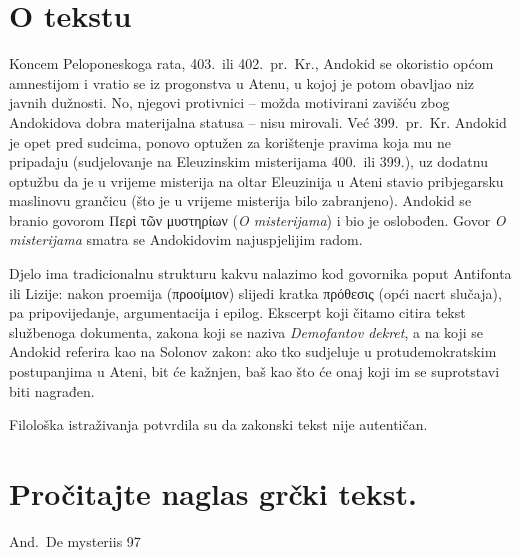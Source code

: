 \section*{O tekstu}

Koncem Peloponeskoga rata, 403.\ ili 402.\ pr.~Kr., Andokid se okoristio općom amnestijom i vratio se iz progonstva u Atenu, u kojoj je potom obavljao niz javnih dužnosti. No, njegovi protivnici – možda motivirani zavišću zbog Andokidova dobra materijalna statusa – nisu mirovali. Već 399.\ pr.~Kr. Andokid je opet pred sudcima, ponovo optužen za korištenje pravima koja mu ne pripadaju (sudjelovanje na Eleuzinskim misterijama 400.\ ili 399.), uz dodatnu optužbu da je u vrijeme misterija na oltar Eleuzinija u Ateni stavio pribjegarsku maslinovu grančicu (što je u vrijeme misterija bilo zabranjeno). Andokid se branio govorom \textgreek[variant=ancient]{Περὶ τῶν μυστηρίων} (\textit{O misterijama}) i bio je oslobođen. Govor \textit{O misterijama} smatra se Andokidovim najuspjelijim radom.

Djelo ima tradicionalnu strukturu kakvu nalazimo kod govornika poput Antifonta ili Lizije: nakon proemija \textgreek[variant=ancient]{(προοίμιον)} slijedi kratka \textgreek[variant=ancient]{πρόθεσις} (opći nacrt slučaja), pa pripovijedanje, argumentacija i epilog. Ekscerpt koji čitamo citira tekst službenoga dokumenta, zakona koji se naziva \textit{Demofantov dekret}, a na koji se Andokid referira kao na Solonov zakon: ako tko sudjeluje u protudemokratskim postupanjima u Ateni, bit će kažnjen, baš kao što će onaj koji im se suprotstavi biti nagrađen.%

Filološka istraživanja potvrdila su da zakonski tekst nije autentičan.



\newpage

\section*{Pročitajte naglas grčki tekst.}

And.\ De mysteriis 97


\medskip


